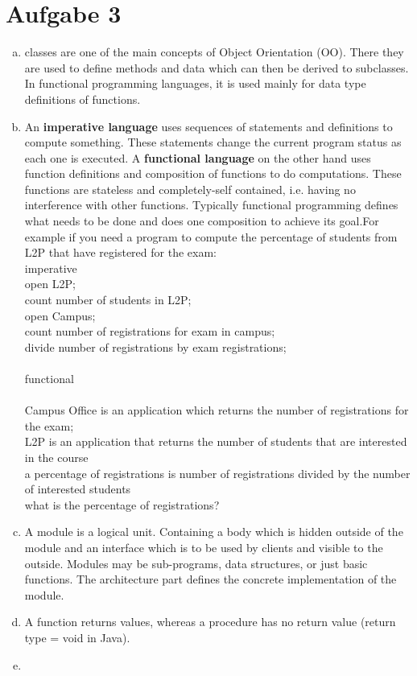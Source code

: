 \documentclass[a4paper,10pt]{scrartcl}[2003/01/01]
\begin{document}
	\section{Aufgabe 3}
	\begin{enumerate}[a)]
		\item classes are one of the main concepts of Object Orientation (OO). There they are used to define methods and data which can then be derived to subclasses. In functional programming languages, it is used mainly for data type definitions of functions.
		\item An \textbf{imperative language} uses sequences of statements and definitions to compute something. These statements change the current program status as each one is executed. A \textbf{functional language} on the other hand uses function definitions and composition of functions to do computations. These functions are stateless and completely-self contained, i.e. having no interference with other functions. Typically functional programming defines what needs to be done and does one composition to achieve its goal.For example if you need a program to compute the percentage of students from L2P that have registered for the exam:\\
		imperative\\
		open L2P;\\
		count number of students in L2P;\\
		open Campus;\\
		count number of registrations for exam in campus;\\
		divide number of registrations by exam registrations;\\~\\
		functional\\~\\
		Campus Office is an application which returns the number of registrations for the exam;\\
		L2P is an application that returns the number of students that are interested in the course\\
		a percentage of registrations is number of registrations divided by the number of interested students\\
		what is the percentage of registrations?
		\item A module is a logical unit. Containing a body which is hidden outside of the module and an interface which is to be used by clients and visible to the outside. Modules may be sub-programs, data structures, or just basic functions. The architecture part defines the concrete implementation of the module.
		\item A function returns values, whereas a procedure has no return value (return type = void in Java).
		\item 
	\end{enumerate}
	
\end{document}
